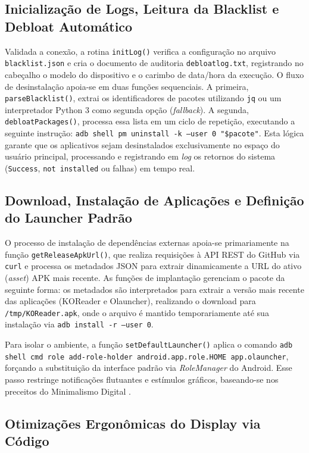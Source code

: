 \documentclass[
    12pt,
    openright,
    oneside,
    a4paper,
    english,
    brazilian
    ]{abntex2}
\begin{document}
\subsection{Inicialização de Logs, Leitura da Blacklist e Debloat Automático}

Validada a conexão, a rotina \texttt{initLog()} verifica a configuração no arquivo \texttt{blacklist.json} e cria o documento de auditoria \texttt{debloatlog.txt}, registrando no cabeçalho o modelo do dispositivo e o carimbo de data/hora da execução. O fluxo de desinstalação apoia-se em duas funções sequenciais. A primeira, \texttt{parseBlacklist()}, extrai os identificadores de pacotes utilizando \texttt{jq} ou um interpretador Python 3 como segunda opção (\textit{fallback}). A segunda, \texttt{debloatPackages()}, processa essa lista em um ciclo de repetição, executando a seguinte instrução: \texttt{adb shell pm uninstall -k --user 0 "\$pacote"}. Esta lógica garante que os aplicativos sejam desinstalados exclusivamente no espaço do usuário principal, processando e registrando em \textit{log} os retornos do sistema (\texttt{Success}, \texttt{not installed} ou falhas) em tempo real.

\subsection{Download, Instalação de Aplicações e Definição do Launcher Padrão}

O processo de instalação de dependências externas apoia-se primariamente na função \texttt{getReleaseApkUrl()}, que realiza requisições à API REST do GitHub via \texttt{curl} e processa os metadados JSON para extrair dinamicamente a URL do ativo (\textit{asset}) APK mais recente. As funções de implantação gerenciam o pacote da seguinte forma: os metadados são interpretados para extrair a versão mais recente das aplicações (KOReader e Olauncher), realizando o download para \texttt{/tmp/KOReader.apk}, onde o arquivo é mantido temporariamente até sua instalação via \texttt{adb install -r --user 0}.

Para isolar o ambiente, a função \texttt{setDefaultLauncher()} aplica o comando \texttt{adb shell cmd role add-role-holder android.app.role.HOME app.olauncher}, forçando a substituição da interface padrão via \textit{RoleManager} do Android. Esse passo restringe notificações flutuantes e estímulos gráficos, baseando-se nos preceitos do Minimalismo Digital \cite{newport2019}.

\subsection{Otimizações Ergonômicas do Display via Código}
\end{document}
